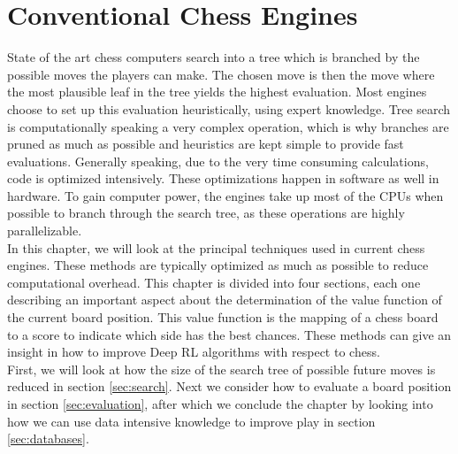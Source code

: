 \chapter{Conventional Chess Engines}
\label{ch:chess}

State of the art chess computers search into a tree which is branched by the possible moves the players can make. The chosen move is then the move where the most plausible leaf in the tree yields the highest evaluation. Most engines choose to set up this evaluation heuristically, using expert knowledge. Tree search is computationally speaking a very complex operation, which is why branches are pruned as much as possible and heuristics are kept simple to provide fast evaluations. Generally speaking, due to the very time consuming calculations, code is optimized intensively. These optimizations happen in software as well in hardware. To gain computer power, the engines take up most of the CPUs when possible to branch through the search tree, as these operations are highly parallelizable. \\ 
In this chapter, we will look at the principal techniques used in current chess engines. These methods are typically optimized as much as possible to reduce computational overhead. This chapter is divided into four sections, each one describing an important aspect about the determination of the value function of the current board position. This value function is the mapping of a chess board to a score to indicate which side has the best chances. These methods can give an insight in how to improve Deep RL algorithms with respect to chess.\\
First, we will look at how the size of the search tree of possible future moves is reduced in section \ref{sec:search}. Next we consider how to evaluate a board position in section \ref{sec:evaluation}, after which we conclude the chapter by looking into how we can use data intensive knowledge to improve play in section \ref{sec:databases}.

